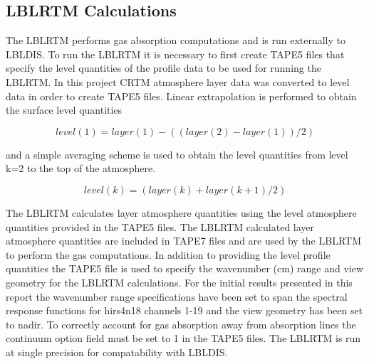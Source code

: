 \subsection{LBLRTM Calculations}
The LBLRTM performs gas absorption computations and is run externally to LBLDIS.
To run the LBLRTM it is necessary to first create TAPE5 files that specify the level quantities
of the profile data to be used for running the LBLRTM. In this project CRTM atmosphere layer data was converted to level data in
order to create TAPE5 files. Linear extrapolation is performed to obtain the surface level quantities 

\begin{equation}
level(1) = layer(1) - ((layer(2) - layer(1))/2)
\end{equation}          

and a simple averaging scheme is used to obtain the level quantities from level k=2 to the top of the atmosphere. 

\begin{equation}
level(k) = (layer(k) + layer(k+1)/2)
\end{equation}

The LBLRTM calculates layer atmosphere quantities using the level atmosphere quantities provided in the TAPE5 files. The LBLRTM calculated layer atmosphere quantities are included in TAPE7 files and are used by the LBLRTM to perform the gas computations.
In addition to providing the level profile quantities the TAPE5 file is used to specify the wavenumber (cm) range and view geometry for the LBLRTM calculations. For the initial results presented in this report the wavenumber range specifications have been set to span the spectral response functions for hirs4\textunderscore{}n18 channels 1-19 and the view geometry has been set to nadir. To correctly account for gas absorption away from absorption lines the continuum option field must be set to 1 in the TAPE5 files. The LBLRTM is run at single precision for compatability with LBLDIS.

